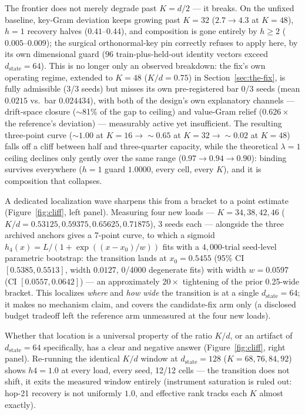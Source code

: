 The frontier does not merely degrade past $K{=}d/2$ --- it breaks. On the
unfixed baseline, key-Gram deviation keeps growing past $K{=}32$
($2.7\to4.3$ at $K{=}48$), $h{=}1$ recovery halves ($0.41$--$0.44$), and
composition is gone entirely by $h\geq2$ ($0.005$--$0.009$); the surgical
orthonormal-key pin correctly refuses to apply here, by its own
dimensional guard ($96$ train-plus-held-out identity vectors exceed
$d_{\mathrm{state}}{=}64$). This is no longer only an observed breakdown:
the fix's own operating regime, extended to $K{=}48$ ($K/d{=}0.75$) in
Section~\ref{sec:the-fix}, is fully admissible (3/3 seeds) but misses its
own pre-registered bar 0/3 seeds (mean $0.0215$ vs.\ bar $0.024434$), with
both of the design's own explanatory channels --- drift-space closure
($\sim$81\% of the gap to ceiling) and value-Gram relief ($0.626\times$
the reference's deviation) --- measurably active yet insufficient. The
resulting three-point curve ($\sim1.00$ at $K{=}16\to\sim0.65$ at
$K{=}32\to\sim0.02$ at $K{=}48$) falls off a cliff between half and
three-quarter capacity, while the theoretical $\lambda{=}1$ ceiling
declines only gently over the same range ($0.97\to0.94\to0.90$): binding
survives everywhere ($h{=}1$ guard $1.0000$, every cell, every $K$), and
it is composition that collapses.

A dedicated localization wave sharpens this from a bracket to a point
estimate (Figure~\ref{fig:cliff}, left panel). Measuring four new loads
--- $K{=}34,38,42,46$ ($K/d{=}0.53125,0.59375,0.65625,0.71875$), 3 seeds
each --- alongside the three archived anchors gives a 7-point curve, to
which a sigmoid $h_4(x)=L/(1+\exp((x-x_0)/w))$ fits with a $4{,}000$-trial
seed-level parametric bootstrap: the transition lands at $x_0{=}0.5455$
(95\% CI $[0.5385,0.5513]$, width $0.0127$, 0/4000 degenerate fits) with
width $w{=}0.0597$ (CI $[0.0557,0.0642]$) --- an approximately $20\times$
tightening of the prior 0.25-wide bracket. This localizes \emph{where} and
\emph{how wide} the transition is at a single $d_{\mathrm{state}}{=}64$;
it makes no mechanism claim, and covers the candidate-fix arm only (a
disclosed budget tradeoff left the reference arm unmeasured at the four
new loads).

Whether that location is a universal property of the ratio $K/d$, or an
artifact of $d_{\mathrm{state}}{=}64$ specifically, has a clear and
negative answer (Figure~\ref{fig:cliff}, right panel). Re-running the
identical $K/d$ window at $d_{\mathrm{state}}{=}128$
($K{=}68,76,84,92$) shows $h4{=}1.0$ at every load, every seed, 12/12
cells --- the transition does not shift, it exits the measured window
entirely (instrument saturation is ruled out: hop-21 recovery is not
uniformly $1.0$, and effective rank tracks each $K$ almost exactly).

